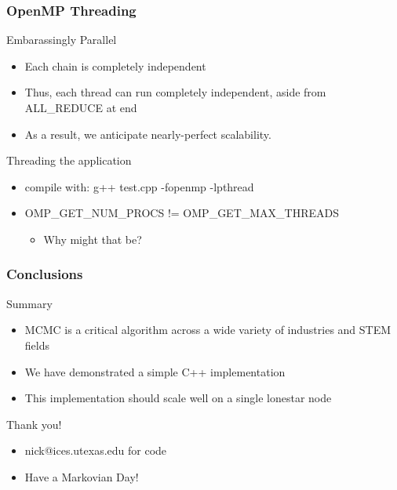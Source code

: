 \documentclass[mathserif]{beamer}
\begin{document}
\begin{frame}
\frametitle{OpenMP Threading}

\begin{block}{Embarassingly Parallel}
  \begin{itemize}
  \item Each chain is completely independent
  \item Thus, each thread can run completely independent, aside from ALL\_REDUCE at end
  \item As a result, we anticipate nearly-perfect scalability. 
  \end{itemize}
\end{block}

\begin{block}{Threading the application}
  \begin{itemize}
  \item compile with: g++ test.cpp -fopenmp -lpthread
  \item OMP\_GET\_NUM\_PROCS != OMP\_GET\_MAX\_THREADS 
    \begin{itemize}
      \item Why might that be?
    \end{itemize}
  \end{itemize}
\end{block}

\end{frame}

\begin{frame}
\frametitle{Conclusions}

\begin{block}{Summary}
\begin{itemize}
  \item MCMC is a critical algorithm across a wide variety of industries and STEM fields
  \item We have demonstrated a simple C++ implementation
  \item This implementation should scale well on a single lonestar node
\end{itemize}
\end{block}

\begin{block}{Thank you!}
\begin{itemize}
\item nick@ices.utexas.edu for code
\item Have a Markovian Day!
\end{itemize}
\end{block}

\end{frame}
\end{document}

